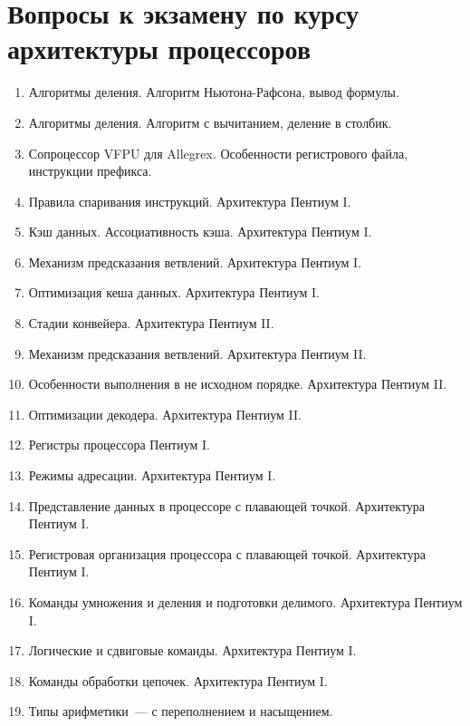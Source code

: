 \documentclass[a4paper,10pt]{article}
\begin{document}
\section*{Вопросы к экзамену по курсу архитектуры процессоров}

\begin{enumerate}

  \item Алгоритмы деления.
        Алгоритм Ньютона-Рафсона, вывод формулы.
  \item Алгоритмы деления.
        Алгоритм с вычитанием, деление в столбик.
  \item Сопроцессор VFPU для Allegrex.
        Особенности регистрового файла, инструкции префикса.
  \item Правила спаривания инструкций.
        Архитектура Пентиум I.
  \item Кэш данных.
        Ассоциативность кэша.
        Архитектура Пентиум I.
  \item Механизм предсказания ветвлений.
        Архитектура Пентиум I.
  \item Оптимизация кеша данных.
        Архитектура Пентиум I.
  \item Стадии конвейера.
        Архитектура Пентиум II.
  \item Механизм предсказания ветвлений.
        Архитектура Пентиум II.
  \item Особенности выполнения в не исходном порядке.
        Архитектура Пентиум II.
  \item Оптимизации декодера.
        Архитектура Пентиум II.
  \item Регистры процессора Пентиум I.
  \item Режимы адресации.
        Архитектура Пентиум I.
  \item Представление данных в процессоре с плавающей точкой.
        Архитектура Пентиум I.
  \item Регистровая организация процессора с плавающей точкой.
        Архитектура Пентиум I.
  \item Команды умножения и деления и подготовки делимого.
        Архитектура Пентиум I.
  \item Логические и сдвиговые команды.
        Архитектура Пентиум I.
  \item Команды обработки цепочек.
        Архитектура Пентиум I.
  \item Типы арифметики~--- с переполнением и насыщением.

\end{enumerate}
\end{document}

